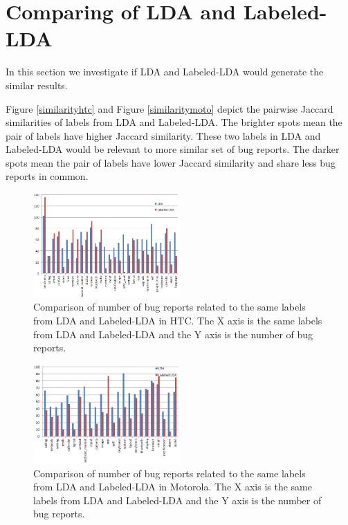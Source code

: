 \documentclass[10pt, conference, compsocconf]{IEEEtran}
\begin{document}
\section{Comparing of LDA and Labeled-LDA}
\label{sec:comparinglda}

In this section we investigate if LDA and Labeled-LDA would generate
the similar results.


Figure \ref{similarityhtc} and Figure \ref{similaritymoto} depict the
pairwise Jaccard similarities of labels from LDA and Labeled-LDA. The
brighter spots mean the pair of labels have higher Jaccard
similarity. These two labels in LDA and Labeled-LDA would be relevant
to more similar set of bug reports. The darker spots mean the pair of
labels have lower Jaccard similarity and share less bug reports in
common.

\begin{figure}[htb]
\centering
\includegraphics[width=0.5\textwidth]{htcldallda.png}
\caption{Comparison of number of bug reports related to the same labels from LDA and Labeled-LDA in HTC. The X axis is the same labels from LDA and Labeled-LDA and the Y axis is the number of bug reports.}
\label{bughtc}
\end{figure}

\begin{figure}[!htb]
\centering
\includegraphics[width=0.5\textwidth]{motoldallda.png}
\caption{Comparison of number of bug reports related to the same labels from LDA and Labeled-LDA in Motorola. The X axis is the same labels from LDA and Labeled-LDA and the Y axis is the number of bug reports.}
\label{bugmoto}
\end{figure}
\end{document}
